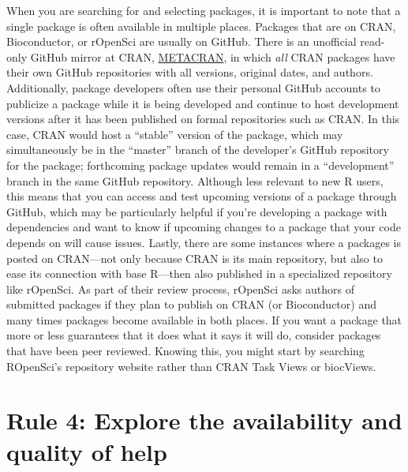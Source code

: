 \documentclass[10pt,letterpaper]{article}
\begin{document}
When you are searching for and selecting packages, it is important to
note that a single package is often available in multiple places.
Packages that are on CRAN, Bioconductor, or rOpenSci are usually on
GitHub. There is an unofficial read-only GitHub mirror at CRAN,
\href{https://github.com/cran}{METACRAN}, in which \emph{all} CRAN
packages have their own GitHub repositories with all versions, original
dates, and authors. Additionally, package developers often use their
personal GitHub accounts to publicize a package while it is being
developed and continue to host development versions after it has been
published on formal repositories such as CRAN. In this case, CRAN would
host a ``stable'' version of the package, which may simultaneously be in
the ``master'' branch of the developer's GitHub repository for the
package; forthcoming package updates would remain in a ``development''
branch in the same GitHub repository. Although less relevant to new R
users, this means that you can access and test upcoming versions of a
package through GitHub, which may be particularly helpful if you're
developing a package with dependencies and want to know if upcoming
changes to a package that your code depends on will cause issues.
Lastly, there are some instances where a packages is posted on
CRAN---not only because CRAN is its main repository, but also to ease
its connection with base R---then also published in a specialized
repository like rOpenSci. As part of their review process, rOpenSci asks
authors of submitted packages if they plan to publish on CRAN (or
Bioconductor) and many times packages become available in both places.
If you want a package that more or less guarantees that it does what it
says it will do, consider packages that have been peer reviewed. Knowing
this, you might start by searching ROpenSci's repository website rather
than CRAN Task Views or biocViews.

\hypertarget{rule-4-explore-the-availability-and-quality-of-help}{%
\section{Rule 4: Explore the availability and quality of
help}\label{rule-4-explore-the-availability-and-quality-of-help}}
\end{document}
